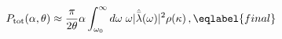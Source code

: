 \begin{equation}
P_{\rm tot}(\alpha,\theta) \approx
\frac{\pi}{2\theta}\alpha \int_{\omega_0}^\infty d\omega\; \omega
|\hat{\bar\lambda}(\omega)|^2 \rho(\kappa) \,,
\eqlabel{final}
\end{equation}

